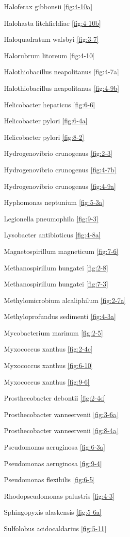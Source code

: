 \documentclass[]{tufte-book}
\begin{document}
Haloferax gibbonsii \ref{fig:4-10a}

Halohasta litchfieldiae \ref{fig:4-10b}

Haloquadratum walsbyi \ref{fig:3-7}

Halorubrum litoreum \ref{fig:4-10}

Halothiobacillus neapolitanus \ref{fig:4-7a}

Halothiobacillus neapolitanus \ref{fig:4-9b}

Helicobacter hepaticus \ref{fig:6-6}

Helicobacter pylori \ref{fig:6-4a}

Helicobacter pylori \ref{fig:8-2}

Hydrogenovibrio crunogenus \ref{fig:2-3}

Hydrogenovibrio crunogenus \ref{fig:4-7b}

Hydrogenovibrio crunogenus \ref{fig:4-9a}

Hyphomonas neptunium \ref{fig:5-3a}

Legionella pneumophila \ref{fig:9-3}

Lysobacter antibioticus \ref{fig:4-8a}

Magnetospirillum magneticum \ref{fig:7-6}

Methanospirillum hungatei \ref{fig:2-8}

Methanospirillum hungatei \ref{fig:7-3}

Methylomicrobium alcaliphilum \ref{fig:2-7a}

Methyloprofundus sedimenti \ref{fig:4-3a}

Mycobacterium marinum \ref{fig:2-5}

Myxococcus xanthus \ref{fig:2-4c}

Myxococcus xanthus \ref{fig:6-10}

Myxococcus xanthus \ref{fig:9-6}

Prosthecobacter debontii \ref{fig:2-4d}

Prosthecobacter vanneervenii \ref{fig:3-6a}

Prosthecobacter vanneervenii \ref{fig:8-4a}

Pseudomonas aeruginosa \ref{fig:6-3a}

Pseudomonas aeruginosa \ref{fig:9-4}

Pseudomonas flexibilis \ref{fig:6-5}

Rhodopseudomonas palustris \ref{fig:4-3}

Sphingopyxis alaskensis \ref{fig:5-6a}

Sulfolobus acidocaldarius \ref{fig:5-11}
\end{document}
